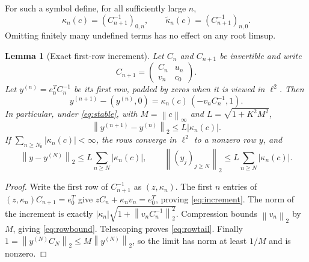 \documentclass[11pt]{article}
\newtheorem{lemma}[theorem]{Lemma}
\theoremstyle{definition}
\newcommand{\norm}[1]{\left\lVert #1\right\rVert}
\begin{document}
For such a symbol define, for all sufficiently large $n$,
\begin{equation}
 \kappa_n(c)=(C_{n+1}^{-1})_{0,n},\qquad
 \widetilde\kappa_n(c)=(C_{n+1}^{-1})_{n,0}.
 \label{eq:corners}
\end{equation}
Omitting finitely many undefined terms has no effect on any root limsup.

\begin{lemma}[Exact first-row increment]\label{lem:increment}
Let $C_n$ and $C_{n+1}$ be invertible and write
\[
 C_{n+1}=\begin{pmatrix}C_n&u_n\\v_n&c_0\end{pmatrix}.
\]
Let $y^{(n)}=e_0^T C_n^{-1}$ be its first row, padded by zeros when it is viewed in $\ell^2$. Then
\begin{equation}
 y^{(n+1)}-(y^{(n)},0)
 =\kappa_n(c)\,(-v_n C_n^{-1},1).
 \label{eq:increment}
\end{equation}
In particular, under \eqref{eq:stable}, with $M=\norm c_\infty$ and $L=\sqrt{1+K^2M^2}$,
\begin{equation}
 \norm{y^{(n+1)}-y^{(n)}}_2\le L|\kappa_n(c)|.
 \label{eq:rowbound}
\end{equation}
If $\sum_{n\ge N_0}|\kappa_n(c)|<\infty$, the rows converge in $\ell^2$ to a nonzero row $y$, and
\begin{equation}
 \norm{y-y^{(N)}}_2\le L\sum_{n\ge N}|\kappa_n(c)|,
 \qquad
 \norm{(y_j)_{j\ge N}}_2\le L\sum_{n\ge N}|\kappa_n(c)|.
 \label{eq:rowtail}
\end{equation}
\end{lemma}
\begin{proof}
Write the first row of $C_{n+1}^{-1}$ as $(z,\kappa_n)$. The first $n$ entries of $(z,\kappa_n)C_{n+1}=e_0^T$ give
$zC_n+\kappa_n v_n=e_0^T$, proving \eqref{eq:increment}. The norm of the increment is exactly
$|\kappa_n|\sqrt{1+\norm{v_nC_n^{-1}}_2^2}$. Compression bounds $\norm{v_n}_2$ by $M$, giving \eqref{eq:rowbound}. Telescoping proves \eqref{eq:rowtail}. Finally $1=\norm{y^{(N)}C_N}_2\le M\norm{y^{(N)}}_2$, so the limit has norm at least $1/M$ and is nonzero.
\end{proof}
\end{document}
